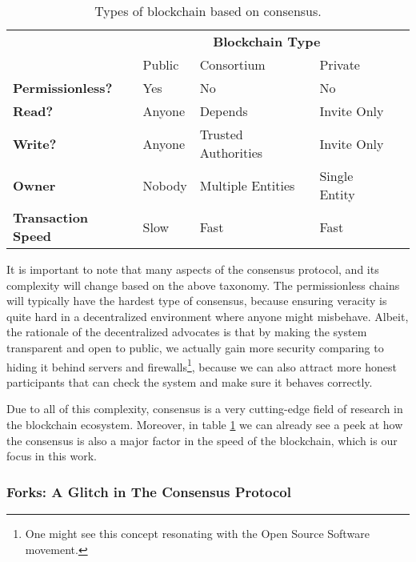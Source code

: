 \begin{table}[]
	\caption{Types of blockchain based on consensus.}
	\label{table:blockchain_types}
	\begin{tabular}{lllll}
													& \multicolumn{3}{c}{\textbf{Blockchain Type}} &
													\\
													& Public & Consortium          & Private       &
	\\ \cline{1-4} \multicolumn{1}{l|}{\textbf{Permissionless?}}   & Yes    & No                  &
	No            &  \\
	\multicolumn{1}{l|}{\textbf{Read?}}             & Anyone & Depends             & Invite Only   &
	\\
	\multicolumn{1}{l|}{\textbf{Write?}}            & Anyone & Trusted Authorities & Invite Only   &
	\\
	\multicolumn{1}{l|}{\textbf{Owner}}             & Nobody & Multiple Entities   & Single Entity &
	\\
	\multicolumn{1}{l|}{\textbf{Transaction Speed}} & Slow   & Fast                & Fast          &
	\end{tabular}
\end{table}


It is important to note that many aspects of the consensus protocol, and its complexity will change
based on the above taxonomy. The permissionless chains will typically have the hardest type of
consensus, because ensuring veracity is quite hard in a decentralized environment where anyone might
misbehave. Albeit, the rationale of the decentralized advocates is that by making the system
transparent and open to public, we actually gain more security comparing to hiding it behind servers
and firewalls\footnote{One might see this concept resonating with the Open Source Software
movement.}, because we can also attract more honest participants that can check the system and make
sure it behaves correctly.

Due to all of this complexity, consensus is a very cutting-edge field of research in the blockchain
ecosystem. Moreover, in table \ref{table:blockchain_types} we can already see a peek at how the
consensus is also a major factor in the speed of the blockchain, which is our focus in this work.

\subsubsection{Forks: A Glitch in The Consensus Protocol}

